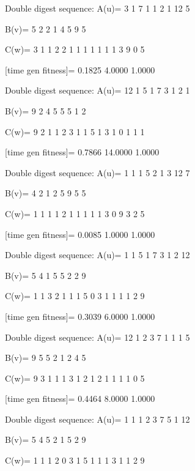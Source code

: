 Double digest sequence:
A(u)=
     3     1     7     1     1     2     1    12     5

B(v)=
     5     2     2     1     4     5     9     5

C(w)=
     3     1     1     2     2     1     1     1     1     1     1     1     3     9     0     5

[time gen fitness]=
    0.1825    4.0000    1.0000

Double digest sequence:
A(u)=
    12     1     5     1     7     3     1     2     1

B(v)=
     9     2     4     5     5     5     1     2

C(w)=
     9     2     1     1     2     3     1     1     5     1     3     1     0     1     1     1

[time gen fitness]=
    0.7866   14.0000    1.0000

Double digest sequence:
A(u)=
     1     1     1     5     2     1     3    12     7

B(v)=
     4     2     1     2     5     9     5     5

C(w)=
     1     1     1     1     2     1     1     1     1     1     3     0     9     3     2     5

[time gen fitness]=
    0.0085    1.0000    1.0000

Double digest sequence:
A(u)=
     1     1     5     1     7     3     1     2    12

B(v)=
     5     4     1     5     5     2     2     9

C(w)=
     1     1     3     2     1     1     1     5     0     3     1     1     1     1     2     9

[time gen fitness]=
    0.3039    6.0000    1.0000

Double digest sequence:
A(u)=
    12     1     2     3     7     1     1     1     5

B(v)=
     9     5     5     2     1     2     4     5

C(w)=
     9     3     1     1     1     3     1     2     1     2     1     1     1     1     0     5

[time gen fitness]=
    0.4464    8.0000    1.0000

Double digest sequence:
A(u)=
     1     1     1     2     3     7     5     1    12

B(v)=
     5     4     5     2     1     5     2     9

C(w)=
     1     1     1     2     0     3     1     5     1     1     1     3     1     1     2     9

